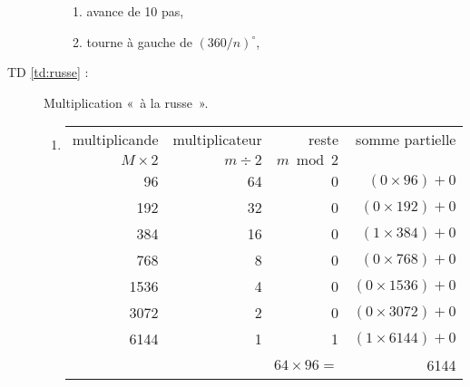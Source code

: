 \begin{description}
\begin{enumerate}
		\begin{enumerate}
		\item avance de 10 pas,
		\item tourne à gauche de $(360/n)^\circ$,
		\end{enumerate}
	\end{enumerate}
\newpage
\item[TD \ref{td:russe} :] Multiplication «~à la russe~».
	\begin{enumerate}
	\item \begin{tabular}[t]{|r|r|r|r|}
		\hline
		multiplicande & multiplicateur & reste      & somme partielle\\
		$M \times 2$  & $m \div 2$     & $m \bmod 2$ &       \\
		\hline
		 96  & 64 &   0   &   $(0\times 96) + 0$ \\
		192  & 32 &   0   &   $(0\times 192) + 0$ \\
		384  & 16 &   0   &   $(1\times 384) + 0$ \\
		768  &  8 &   0   &   $(0\times 768) + 0$  \\
	       1536  &  4 &   0   &   $(0\times 1536) + 0$ \\
	       3072  &  2 &   0   &   $(0\times 3072) + 0$ \\
	       6144  &  1 &   1   &   $(1\times 6144) + 0$ \\
		\hline
		\multicolumn{3}{|r|}{$64 \times 96 =$} & 6144\\
		\hline
		\end{tabular}


\end{enumerate}
\end{description}
